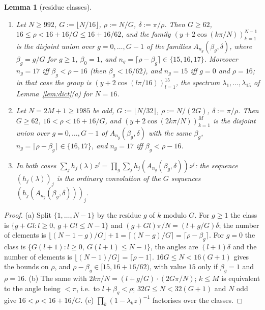 \documentclass[11pt,a4paper]{article}
\newtheorem{lemma}[theorem]{Lemma}
\theoremstyle{definition}
\begin{document}
\begin{lemma}[residue classes]\label{lem:classes}
\begin{enumerate}
\item[(a)] Let $N\ge992$, $G:=\lfloor N/16\rfloor$, $\rho:=N/G$, $\delta:=\pi/\rho$. Then $G\ge62$, $16\le\rho<16+16/G\le16+16/62$, and the family $(y+2\cos(k\pi/N))_{k=1}^{N-1}$ is the disjoint union over $g=0,\dots,G-1$ of the families $A_{n_g}(\beta_g,\delta)$, where $\beta_g=g/G$ for $g\ge1$, $\beta_0=1$, and $n_g=\lceil\rho-\beta_g\rceil\in\{15,16,17\}$. Moreover $n_g=17$ iff $\beta_g<\rho-16$ (then $\beta_g<16/62$), and $n_g=15$ iff $g=0$ and $\rho=16$; in that case the group is $(y+2\cos(l\pi/16))_{l=1}^{15}$, the spectrum $\lambda_1,\dots,\lambda_{15}$ of Lemma~\ref{lem:dict}(a) for $N=16$.
\item[(b)] Let $N=2M+1\ge1985$ be odd, $G:=\lfloor N/32\rfloor$, $\rho:=N/(2G)$, $\delta:=\pi/\rho$. Then $G\ge62$, $16<\rho<16+16/G$, and $(y+2\cos(2k\pi/N))_{k=1}^M$ is the disjoint union over $g=0,\dots,G-1$ of $A_{n_g}(\beta_g,\delta)$ with the same $\beta_g$, $n_g=\lceil\rho-\beta_g\rceil\in\{16,17\}$, and $n_g=17$ iff $\beta_g<\rho-16$.
\item[(c)] In both cases $\sum_jh_j(\lambda)z^j=\prod_g\sum_jh_j(A_{n_g}(\beta_g,\delta))z^j$: the sequence $(h_j(\lambda))_j$ is the ordinary convolution of the $G$ sequences $(h_j(A_{n_g}(\beta_g,\delta)))_j$.
\end{enumerate}
\end{lemma}
\begin{proof}
(a) Split $\{1,\dots,N-1\}$ by the residue $g$ of $k$ modulo $G$. For $g\ge1$ the class is $\{g+Gl:l\ge0,\ g+Gl\le N-1\}$ and $(g+Gl)\pi/N=(l+g/G)\delta$; the number of elements is $\lfloor(N-1-g)/G\rfloor+1=\lceil(N-g)/G\rceil=\lceil\rho-\beta_g\rceil$. For $g=0$ the class is $\{G(l+1):l\ge0,\ G(l+1)\le N-1\}$, the angles are $(l+1)\delta$ and the number of elements is $\lfloor(N-1)/G\rfloor=\lceil\rho-1\rceil$. $16G\le N<16(G+1)$ gives the bounds on $\rho$, and $\rho-\beta_g\in[15,16+16/62)$, with value $15$ only if $\beta_g=1$ and $\rho=16$. (b) The same with $2k\pi/N=(l+g/G)\cdot(2G\pi/N)$; $k\le M$ is equivalent to the angle being $<\pi$, i.e.\ to $l+\beta_g<\rho$; $32G\le N<32(G+1)$ and $N$ odd give $16<\rho<16+16/G$. (c) $\prod_k(1-\lambda_kz)^{-1}$ factorises over the classes.
\end{proof}
\end{document}

